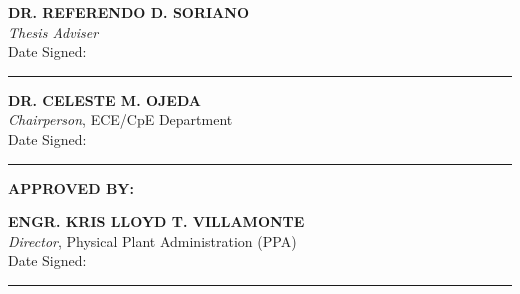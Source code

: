 \vspace{2\baselineskip}
\noindent
\begin{minipage}[t]{0.47\textwidth}
\centering
\textbf{DR. REFERENDO D. SORIANO}\\
\emph{Thesis Adviser}\\
Date Signed: \rule{1.45in}{0.4pt}
\end{minipage}\hfill
\begin{minipage}[t]{0.47\textwidth}
\centering
\textbf{DR. CELESTE M. OJEDA}\\
\emph{Chairperson}, ECE/CpE Department\\
Date Signed: \rule{1.45in}{0.4pt}
\end{minipage}

\vspace{1\baselineskip}
\noindent\textbf{APPROVED BY:}

\vspace{2\baselineskip}
\noindent
\begin{minipage}[t]{0.58\textwidth}
\centering
\textbf{ENGR. KRIS LLOYD T. VILLAMONTE}\\
\emph{Director}, Physical Plant Administration (PPA)\\
Date Signed: \rule{1.45in}{0.4pt}
\end{minipage}
